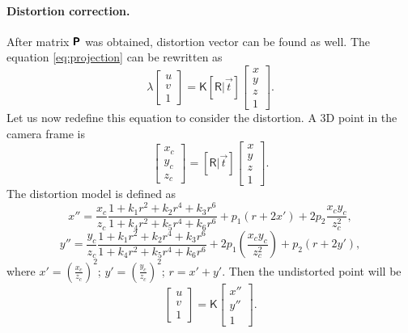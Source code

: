 \paragraph{Distortion correction.}
After matrix $\pmb{\mathsf{P}}$ was obtained, distortion vector can be found as well.
The equation \eqref{eq:projection} can be rewritten as
\begin{equation}
    \label{eq:dist_start}
    \lambda \begin{bmatrix} 
        u \\ v \\ 1 \end{bmatrix} = \pmb{\mathsf{K}} [\pmb{\mathsf{R}} | \vec{t}] \begin{bmatrix} x \\ y \\ z \\ 1
    \end{bmatrix}.
\end{equation}
Let us now redefine this equation to consider the distortion. A 3D point in the camera frame is 
\begin{equation}
    \label{eq:dist_2}
    \begin{bmatrix} x_c \\ y_c \\ z_c \end{bmatrix}
     = [\pmb{\mathsf{R}} | \vec{t}] \begin{bmatrix} x \\ y \\ z \\ 1
    \end{bmatrix}.
\end{equation}
The distortion model is defined as 
\begin{equation}
    \label{eq:dist_3}
    x'' = \frac{x_c}{z_c} \frac{1 + k_1r^2 + k_2r^4 + k_3r^6}{1 + k_4r^2 + k_5r^4 + k_6r^6} + p_1(r + 2x') + 2p_2\frac{x_c y_c}{z^2_c},
\end{equation}
\begin{equation}
    \label{eq:dist_4}
    y'' = \frac{y_c}{z_c} \frac{1 + k_1r^2 + k_2r^4 + k_3r^6}{1 + k_4r^2 + k_5r^4 + k_6r^6} + 2p_1(\frac{x_c y_c}{z_c^2}) + p_2(r + 2y'),
\end{equation}
where $x' = (\frac{x_c}{z_c})^2$; $y' = (\frac{y_c}{z_c})^2$; $r = x' + y'$. Then the undistorted point will be
\begin{equation}
    \label{eq:dist_end}
    \begin{bmatrix} u \\ v \\ 1 \end{bmatrix} = \pmb{\mathsf{K}} \begin{bmatrix} x'' \\ y'' \\ 1 \end{bmatrix}.
\end{equation}

